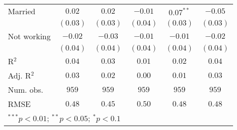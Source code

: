 \begin{table}
\begin{center}
\begin{tabular}{l c c c c c}
Married              & $0.02$        & $0.02$        & $-0.01$     & $0.07^{**}$ & $-0.05$       \\
                     & $(0.03)$      & $(0.03)$      & $(0.04)$    & $(0.03)$    & $(0.03)$      \\
Not working          & $-0.02$       & $-0.03$       & $-0.01$     & $-0.01$     & $-0.02$       \\
                     & $(0.04)$      & $(0.04)$      & $(0.04)$    & $(0.04)$    & $(0.04)$      \\
\midrule
R$^2$                & $0.04$        & $0.03$        & $0.01$      & $0.02$      & $0.04$        \\
Adj. R$^2$           & $0.03$        & $0.02$        & $0.00$      & $0.01$      & $0.03$        \\
Num. obs.            & $959$         & $959$         & $959$       & $959$       & $959$         \\
RMSE                 & $0.48$        & $0.45$        & $0.50$      & $0.48$      & $0.48$        \\
\bottomrule
\multicolumn{6}{l}{\scriptsize{$^{***}p<0.01$; $^{**}p<0.05$; $^{*}p<0.1$}}
\end{tabular}
\label{tab_risk}
\end{center}
\end{table}
